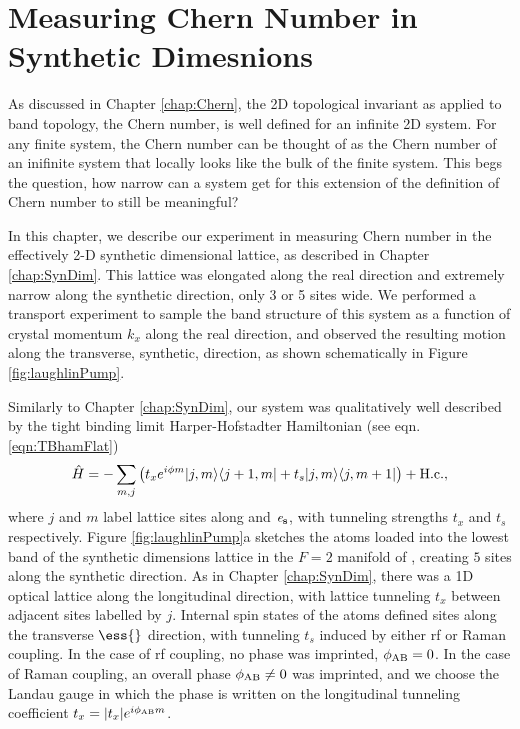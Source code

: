 \renewcommand{\thechapter}{7}

\chapter{Measuring Chern Number in Synthetic Dimesnions}\label{chap:BlochOsc}
As discussed in Chapter \ref{chap:Chern}, the 2D topological invariant as applied to band topology, the Chern number, is well defined for an infinite 2D system. For any finite system, the Chern number can be thought of as the Chern number of an inifinite system that locally looks like the bulk of the finite system. This begs the question, how narrow can a system get for this extension of the definition of Chern number to still be meaningful? 

In this chapter, we describe our experiment in measuring Chern number in the effectively 2-D synthetic dimensional lattice, as described in Chapter \ref{chap:SynDim}. This lattice was elongated along the real direction and extremely narrow along the synthetic direction, only 3 or 5 sites wide. We performed a transport experiment to sample the band structure of this system as a function of crystal momentum $k_x$ along the real direction, and observed the resulting motion along the transverse, synthetic, direction, as shown schematically in Figure \ref{fig:laughlinPump}. 

Similarly to Chapter \ref{chap:SynDim}, our system was qualitatively well described by the tight binding limit Harper-Hofstadter Hamiltonian (see eqn. \ref{eqn:TBhamFlat})\cite{Harper1955,Hofstadter1976}
\begin{equation}
\hat{H}= -\sum\limits_{m,j}\left({t_x e^{i\phi m}|j,m\rangle\langle j+1,m|+t_s|j,m\rangle\langle j,m+1|}\right) + \rm{H.c.},
\label{eqn:Hamiltonian}
\end{equation}
where $j$ and $m$ label lattice sites along \ex{} and $\bf{\mathit{e}_s}$, with tunneling strengths $t_x$ and $t_s$ respectively.
Figure \ref{fig:laughlinPump}a sketches the atoms loaded into the lowest band of the synthetic dimensions lattice in the $F=2$ manifold of \Rb{}, creating $5$ sites along the synthetic direction. As in Chapter \ref{chap:SynDim}, there was a 1D optical lattice along the longitudinal \ex{} direction, with lattice tunneling $t_x$ between adjacent sites labelled by $j$. Internal spin states of the atoms defined sites along the transverse $\ess{}$ direction, with tunneling $t_s$ induced by either rf or Raman coupling. In the case of rf coupling, no phase was imprinted, $\phi_{\rm AB}=0$. In the case of Raman coupling, an overall phase $\phi_{\rm AB}\neq 0$ was imprinted, and we choose the Landau gauge in which the phase is written on the longitudinal tunneling coefficient $t_x=|t_x|e^{i\phi_{\rm AB}m}$.


